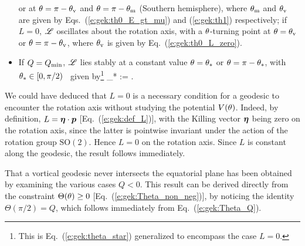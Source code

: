 \begin{prop}
\begin{itemize}
or at $\theta=\pi-\theta_{\rm v}$ and $\theta=\pi-\theta_{\rm m}$ (Southern hemisphere), where
$\theta_{\rm m}$ and $\theta_{\rm v}$ are given by Eqs.~(\ref{e:gek:th0_E_gt_mu}) and
(\ref{e:gek:th1}) respectively; if $L=0$,
$\mathscr{L}$ oscillates about the rotation axis, with a $\theta$-turning point at
$\theta=\theta_{\rm v}$ or $\theta = \pi - \theta_{\rm v}$, where $\theta_{\rm v}$
is given by Eq.~(\ref{e:gek:th0_L_zero}).
\item If $Q = Q_{\rm min}$, $\mathscr{L}$ lies stably at a constant value $\theta=\theta_*$
or $\theta = \pi - \theta_*$, with $\theta_*\in [0, \pi/2)$%
\ given by\footnote{This is Eq.~(\ref{e:gek:theta_star})
generalized to encompass the case $L=0$.}
\be
     \th_* := \arcsin{} .
\ee
\end{itemize}
\end{prop}

\begin{remark}
We could have deduced that $L=0$ is a necessary condition for a geodesic
to encounter the rotation axis without studying the potential $V(\theta)$. Indeed,
by definition, $L = \bm{\eta}\cdot\bm{p}$ [Eq.~(\ref{e:gek:def_L})], with the Killing
vector $\bm{\eta}$ being zero on the rotation axis, since the latter is
pointwise invariant under the action of the rotation group $\mathrm{SO}(2)$.
Hence $L=0$ on the rotation axis. Since $L$ is constant along the geodesic,
the result follows immediately.
\end{remark}

\begin{remark}
That a vortical geodesic never intersects the equatorial plane has been
obtained by examining the various cases $Q<0$. This result can be derived
directly from the constraint $\Theta(\theta)\geq 0$ [Eq.~(\ref{e:gek:Theta_non_neg})],
by noticing the identity
$\Theta(\pi/2) = Q$, which follows immediately from Eq.~(\ref{e:gek:Theta_Q}).
\end{remark}

